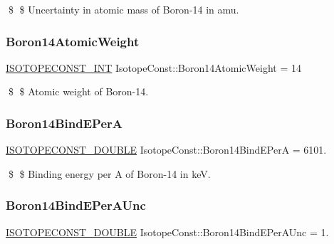 \$ \$ Uncertainty in atomic mass of Boron-\/14 in amu. \mbox{\label{group___isotope_const-_boron-_b14_ga7698ce9a0d801fa58b95e6fe496a78da}} 
\subsubsection{\texorpdfstring{Boron14\+Atomic\+Weight}{Boron14AtomicWeight}}
{\footnotesize\ttfamily \mbox{\hyperlink{group___isotope_const-_macros_ga5f18360b3e99483a35c32d789e62621c}{I\+S\+O\+T\+O\+P\+E\+C\+O\+N\+S\+T\+\_\+\+I\+NT}} Isotope\+Const\+::\+Boron14\+Atomic\+Weight = 14}

\$ \$ Atomic weight of Boron-\/14. \mbox{\label{group___isotope_const-_boron-_b14_ga276e64064ba2aa21c52d54ea1480a328}} 
\subsubsection{\texorpdfstring{Boron14\+Bind\+E\+PerA}{Boron14BindEPerA}}
{\footnotesize\ttfamily \mbox{\hyperlink{group___isotope_const-_macros_ga8f45a7272ce02c0b4c65c44636ed719a}{I\+S\+O\+T\+O\+P\+E\+C\+O\+N\+S\+T\+\_\+\+D\+O\+U\+B\+LE}} Isotope\+Const\+::\+Boron14\+Bind\+E\+PerA = 6101.}

\$ \$ Binding energy per A of Boron-\/14 in keV. \mbox{\label{group___isotope_const-_boron-_b14_gae24c809cf1fca5c365241d34c2a541cd}} 
\subsubsection{\texorpdfstring{Boron14\+Bind\+E\+Per\+A\+Unc}{Boron14BindEPerAUnc}}
{\footnotesize\ttfamily \mbox{\hyperlink{group___isotope_const-_macros_ga8f45a7272ce02c0b4c65c44636ed719a}{I\+S\+O\+T\+O\+P\+E\+C\+O\+N\+S\+T\+\_\+\+D\+O\+U\+B\+LE}} Isotope\+Const\+::\+Boron14\+Bind\+E\+Per\+A\+Unc = 1.}

